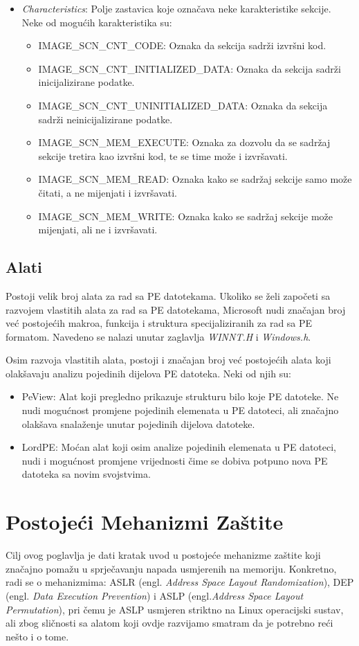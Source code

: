 \documentclass[times, utf8, diplomski, numeric]{fer}
\begin{document}
\begin{itemize}
\item \emph{Characteristics}: Polje zastavica koje označava neke karakteristike sekcije. Neke od mogućih karakteristika su:
\begin{itemize}
\item IMAGE\_SCN\_CNT\_CODE: Oznaka da sekcija sadrži izvršni kod.
\item IMAGE\_SCN\_CNT\_INITIALIZED\_DATA: Oznaka da sekcija sadrži inicijalizirane podatke.
\item IMAGE\_SCN\_CNT\_UNINITIALIZED\_DATA: Oznaka da sekcija sadrži neinicijalizirane podatke.
\item IMAGE\_SCN\_MEM\_EXECUTE: Oznaka za dozvolu da se sadržaj sekcije tretira kao izvršni kod, te se time može i izvršavati.
\item IMAGE\_SCN\_MEM\_READ: Oznaka kako se sadržaj sekcije samo može čitati, a ne mijenjati i izvršavati.
\item IMAGE\_SCN\_MEM\_WRITE: Oznaka kako se sadržaj sekcije može mijenjati, ali ne i izvršavati.
\end{itemize}
\end{itemize}

\section{Alati}
Postoji velik broj alata za rad sa PE datotekama. Ukoliko se želi započeti sa razvojem vlastitih alata za rad sa PE datotekama, Microsoft nudi značajan broj već postojećih makroa, funkcija i struktura specijaliziranih za rad sa PE formatom. Navedeno se nalazi unutar zaglavlja \emph{WINNT.H} i \emph{Windows.h}.

Osim razvoja vlastitih alata, postoji i značajan broj već postojećih alata koji olakšavaju analizu pojedinih dijelova PE datoteka. Neki od njih su:
\begin{itemize}
\item PeView: Alat koji pregledno prikazuje strukturu bilo koje PE datoteke. Ne nudi mogućnost promjene pojedinih elemenata u PE datoteci, ali značajno olakšava snalaženje unutar pojedinih dijelova datoteke.
\item LordPE: Moćan alat koji osim analize pojedinih elemenata u PE datoteci, nudi i mogućnost promjene vrijednosti čime se dobiva potpuno nova PE datoteka sa novim svojstvima.
\end{itemize}

\chapter{Postojeći Mehanizmi Zaštite}
Cilj ovog poglavlja je dati kratak uvod u postojeće mehanizme zaštite koji značajno pomažu u sprječavanju napada usmjerenih na memoriju. Konkretno, radi se o mehanizmima: ASLR (engl. \emph{Address Space Layout Randomization}), DEP (engl. \emph{Data Execution Prevention}) i ASLP (engl.\emph{Address Space Layout Permutation}), pri čemu je ASLP usmjeren striktno na Linux operacijski sustav, ali zbog sličnosti sa alatom koji ovdje razvijamo smatram da je potrebno reći nešto i o tome. 
\end{document}
